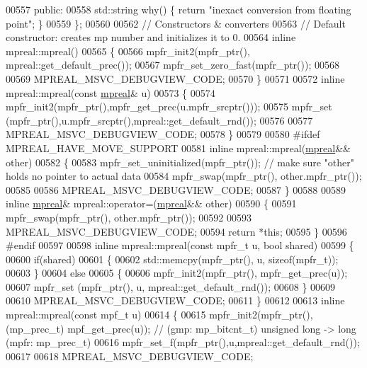 \begin{DoxyCode}
00557 \textcolor{keyword}{public}:
00558     std::string why() \{ \textcolor{keywordflow}{return} \textcolor{stringliteral}{"inexact conversion from floating point"}; \}
00559 \};
00560 
00562 \textcolor{comment}{// Constructors & converters}
00563 \textcolor{comment}{// Default constructor: creates mp number and initializes it to 0.}
00564 \textcolor{keyword}{inline} mpreal::mpreal()
00565 \{
00566     mpfr\_init2(mpfr\_ptr(), mpreal::get\_default\_prec());
00567     mpfr\_set\_zero\_fast(mpfr\_ptr());
00568 
00569     MPREAL\_MSVC\_DEBUGVIEW\_CODE;
00570 \}
00571 
00572 \textcolor{keyword}{inline} mpreal::mpreal(\textcolor{keyword}{const} \hyperlink{classmpfr_1_1mpreal}{mpreal}& u)
00573 \{
00574     mpfr\_init2(mpfr\_ptr(),mpfr\_get\_prec(u.mpfr\_srcptr()));
00575     mpfr\_set  (mpfr\_ptr(),u.mpfr\_srcptr(),mpreal::get\_default\_rnd());
00576 
00577     MPREAL\_MSVC\_DEBUGVIEW\_CODE;
00578 \}
00579 
00580 \textcolor{preprocessor}{#ifdef MPREAL\_HAVE\_MOVE\_SUPPORT}
00581 \textcolor{keyword}{inline} mpreal::mpreal(\hyperlink{classmpfr_1_1mpreal}{mpreal}&& other)
00582 \{
00583     mpfr\_set\_uninitialized(mpfr\_ptr());     \textcolor{comment}{// make sure "other" holds no pointer to actual data}
00584     mpfr\_swap(mpfr\_ptr(), other.mpfr\_ptr());
00585 
00586     MPREAL\_MSVC\_DEBUGVIEW\_CODE;
00587 \}
00588 
00589 \textcolor{keyword}{inline} \hyperlink{classmpfr_1_1mpreal}{mpreal}& mpreal::operator=(\hyperlink{classmpfr_1_1mpreal}{mpreal}&& other)
00590 \{
00591     mpfr\_swap(mpfr\_ptr(), other.mpfr\_ptr());
00592 
00593     MPREAL\_MSVC\_DEBUGVIEW\_CODE;
00594     \textcolor{keywordflow}{return} *\textcolor{keyword}{this};
00595 \}
00596 \textcolor{preprocessor}{#endif}
00597 
00598 \textcolor{keyword}{inline} mpreal::mpreal(\textcolor{keyword}{const} mpfr\_t  u, \textcolor{keywordtype}{bool} shared)
00599 \{
00600     \textcolor{keywordflow}{if}(shared)
00601     \{
00602         std::memcpy(mpfr\_ptr(), u, \textcolor{keyword}{sizeof}(mpfr\_t));
00603     \}
00604     \textcolor{keywordflow}{else}
00605     \{
00606         mpfr\_init2(mpfr\_ptr(), mpfr\_get\_prec(u));
00607         mpfr\_set  (mpfr\_ptr(), u, mpreal::get\_default\_rnd());
00608     \}
00609 
00610     MPREAL\_MSVC\_DEBUGVIEW\_CODE;
00611 \}
00612 
00613 \textcolor{keyword}{inline} mpreal::mpreal(\textcolor{keyword}{const} mpf\_t u)
00614 \{
00615     mpfr\_init2(mpfr\_ptr(),(mp\_prec\_t) mpf\_get\_prec(u)); \textcolor{comment}{// (gmp: mp\_bitcnt\_t) unsigned long -> long (mpfr:
       mp\_prec\_t)}
00616     mpfr\_set\_f(mpfr\_ptr(),u,mpreal::get\_default\_rnd());
00617 
00618     MPREAL\_MSVC\_DEBUGVIEW\_CODE;

\end{DoxyCode}
